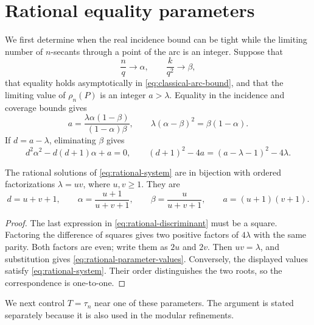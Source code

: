 \section{Rational equality parameters}\label{sec:rational-parameters}

We first determine when the real incidence bound can be tight while the
limiting number of \(n\)-secants through a point of the arc is an integer.
Suppose that
\[
 \frac nq\longrightarrow\alpha,\qquad
 \frac{k}{q^2}\longrightarrow\beta,
\]
that equality holds asymptotically in \eqref{eq:classical-arc-bound}, and that
the limiting value of \(\rho_n(P)\) is an integer \(a>\lambda\).  Equality in
the incidence and coverage bounds gives
\begin{equation}\label{eq:rational-system}
 a=\frac{\lambda\alpha(1-\beta)}{(1-\alpha)\beta},
 \qquad
 \lambda(\alpha-\beta)^2=\beta(1-\alpha).
\end{equation}
If \(d=a-\lambda\), eliminating \(\beta\) gives
\begin{equation}\label{eq:rational-discriminant}
 d^2\alpha^2-d(d+1)\alpha+a=0,
 \qquad
 (d+1)^2-4a=(a-\lambda-1)^2-4\lambda.
\end{equation}

\begin{lemma}
\label{lem:rational-parameters}
The rational solutions of \eqref{eq:rational-system} are in bijection with
ordered factorizations \(\lambda=uv\), where \(u,v\ge1\).  They are
\begin{equation}\label{eq:rational-parameter-values}
 d=u+v+1,\qquad
 \alpha=\frac{u+1}{u+v+1},\qquad
 \beta=\frac{u}{u+v+1},\qquad
 a=(u+1)(v+1).
\end{equation}
\end{lemma}

\begin{proof}
The last expression in \eqref{eq:rational-discriminant} must be a square.
Factoring the difference of squares gives two positive factors of
\(4\lambda\) with the same parity.  Both factors are even; write them as
\(2u\) and \(2v\).  Then \(uv=\lambda\), and substitution gives
\eqref{eq:rational-parameter-values}.  Conversely, the displayed values
satisfy \eqref{eq:rational-system}.  Their order distinguishes the two roots,
so the correspondence is one-to-one.
\end{proof}

We next control \(T=\tau_n\) near one of these parameters.  The argument is
stated separately because it is also used in the modular refinements.

